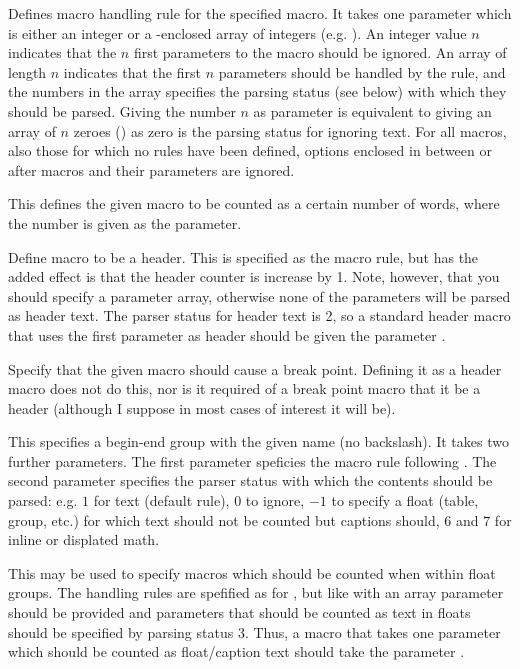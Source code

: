 
\begin{description}
\sloppy
\def\option[#1]{\item[\bigcode{#1}]}

\option[macro]Defines macro handling rule for the specified macro. It takes one parameter which is either an integer or a \code{[]}-enclosed array of integers (e.g. \code{[0,1,0]}). An integer value $n$ indicates that the $n$ first parameters to the macro should be ignored. An array of length $n$ indicates that the first $n$ parameters should be handled by the rule, and the numbers in the array specifies the parsing status (see below) with which they should be parsed. Giving the number $n$ as parameter is equivalent to giving an array of $n$ zeroes (\code{[0,\ldots,0]}) as zero is the parsing status for ignoring text. For all macros, also those for which no rules have been defined, options enclosed in \code{[]} between or after macros and their parameters are ignored.

\option[macroword]This defines the given macro to be counted as a certain number of words, where the number is given as the parameter.

\option[header]Define macro to be a header. This is specified as the macro rule, but has the added effect is that the header counter is increase by 1. Note, however, that you should specify a parameter array, otherwise none of the parameters will be parsed as header text. The parser status for header text is 2, so a standard header macro that uses the first parameter as header should be given the parameter \code{[2]}.

\option[breakmacro]Specify that the given macro should cause a break point. Defining it as a header macro does not do this, nor is it required of a break point macro that it be a header (although I suppose in most cases of interest it will be).

\option[group]This specifies a begin-end group with the given name (no backslash). It takes two further parameters. The first parameter speficies the macro rule following . The second parameter specifies the parser status with which the contents should be parsed: e.g. $1$ for text (default rule), $0$ to ignore, $-1$ to specify a float (table, group, etc.) for which text should not be counted but captions should, $6$ and $7$ for inline or displated math.

\option[floatinclude]This may be used to specify macros which should be counted when within float groups. The handling rules are spefified as for , but like with  an array parameter should be provided and parameters that should be counted as text in floats should be specified by parsing status 3. Thus, a macro that takes one parameter which should be counted as float/caption text should take the parameter \code{[3]}.


\end{description}
